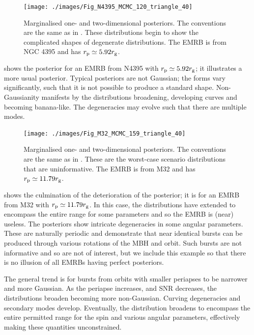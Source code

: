 \begin{figure}
\centering
\vspace{0.5\baselineskip}
   \texttt{[image: ./images/Fig\_N4395\_MCMC\_120\_triangle\_40]}
\caption{Marginalised one- and two-dimensional posteriors. The conventions are the same as in . These distributions begin to show the complicated shapes of degenerate distributions. The EMRB is from NGC 4395 and has $r_\mathrm{p} \simeq 5.92 r_\mathrm{g}$.}
\label{fig:MCMC-b}
\end{figure}
 shows the posterior for an EMRB from N4395 with $r_\mathrm{p} \simeq 5.92 r_\mathrm{g}$; it illustrates a more usual posterior. Typical posteriors are not Gaussian; the forms vary significantly, such that it is not possible to produce a standard shape. Non-Gaussianity manifests by the distributions broadening, developing curves and becoming banana-like. The degeneracies may evolve such that there are multiple modes.

\begin{figure}
\centering
	\vspace{0.5\baselineskip}
   \texttt{[image: ./images/Fig\_M32\_MCMC\_159\_triangle\_40]}
\caption{Marginalised one- and two-dimensional posteriors. The conventions are the same as in . These are the worst-case scenario distributions that are uninformative. The EMRB is from M32 and has $r_\mathrm{p} \simeq 11.79 r_\mathrm{g}$.}
\label{fig:MCMC-c}
\end{figure}
 shows the culmination of the deterioration of the posterior; it is for an EMRB from M32 with $r_\mathrm{p} \simeq 11.79 r_\mathrm{g}$. In this case, the distributions have extended to encompass the entire range for some parameters and so the EMRB is (near) useless. The posteriors show intricate degeneracies in some angular parameters. These are naturally periodic and demonstrate that near identical bursts can be produced through various rotations of the MBH and orbit. Such bursts are not informative and so are not of interest, but we include this example so that there is no illusion of all EMRBs having perfect posteriors.

The general trend is for bursts from orbits with smaller periapses to be narrower and more Gaussian. As the periapse increases, and SNR decreases, the distributions broaden becoming more non-Gaussian. Curving degeneracies and secondary modes develop. Eventually, the distribution broadens to encompass the entire permitted range for the spin and various angular parameters, effectively making these quantities unconstrained.

